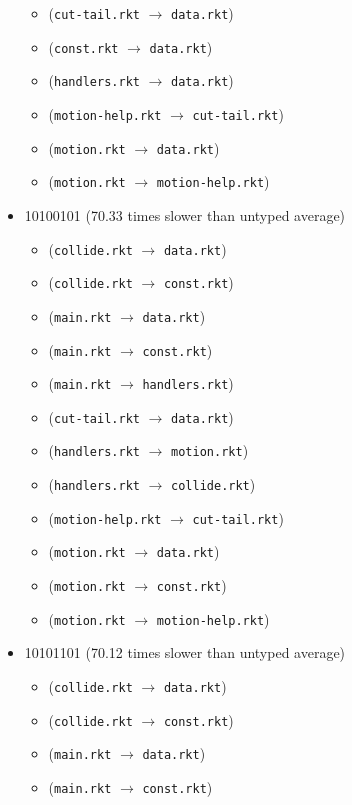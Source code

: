 \documentclass{article}
\newcommand{\mono}[1]{\texttt{#1}}
\begin{document}
\begin{itemize}
\begin{itemize}
  \item (\mono{cut-tail.rkt} $\rightarrow$ \mono{data.rkt})
  \item (\mono{const.rkt} $\rightarrow$ \mono{data.rkt})
  \item (\mono{handlers.rkt} $\rightarrow$ \mono{data.rkt})
  \item (\mono{motion-help.rkt} $\rightarrow$ \mono{cut-tail.rkt})
  \item (\mono{motion.rkt} $\rightarrow$ \mono{data.rkt})
  \item (\mono{motion.rkt} $\rightarrow$ \mono{motion-help.rkt})
  \end{itemize}
\item 10100101 (70.33 times slower than untyped average)
  \begin{itemize}
  \item (\mono{collide.rkt} $\rightarrow$ \mono{data.rkt})
  \item (\mono{collide.rkt} $\rightarrow$ \mono{const.rkt})
  \item (\mono{main.rkt} $\rightarrow$ \mono{data.rkt})
  \item (\mono{main.rkt} $\rightarrow$ \mono{const.rkt})
  \item (\mono{main.rkt} $\rightarrow$ \mono{handlers.rkt})
  \item (\mono{cut-tail.rkt} $\rightarrow$ \mono{data.rkt})
  \item (\mono{handlers.rkt} $\rightarrow$ \mono{motion.rkt})
  \item (\mono{handlers.rkt} $\rightarrow$ \mono{collide.rkt})
  \item (\mono{motion-help.rkt} $\rightarrow$ \mono{cut-tail.rkt})
  \item (\mono{motion.rkt} $\rightarrow$ \mono{data.rkt})
  \item (\mono{motion.rkt} $\rightarrow$ \mono{const.rkt})
  \item (\mono{motion.rkt} $\rightarrow$ \mono{motion-help.rkt})
  \end{itemize}
\item 10101101 (70.12 times slower than untyped average)
  \begin{itemize}
  \item (\mono{collide.rkt} $\rightarrow$ \mono{data.rkt})
  \item (\mono{collide.rkt} $\rightarrow$ \mono{const.rkt})
  \item (\mono{main.rkt} $\rightarrow$ \mono{data.rkt})
  \item (\mono{main.rkt} $\rightarrow$ \mono{const.rkt})

\end{itemize}
\end{itemize}
\end{document}
